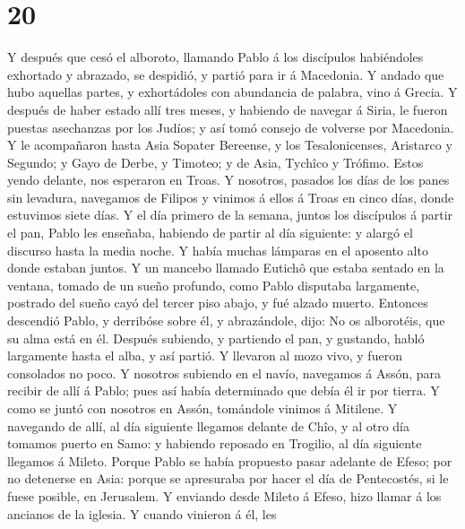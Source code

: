 \hypertarget{section-19}{%
\section{20}\label{section-19}}

 Y después que cesó el alboroto, llamando Pablo á los
discípulos habiéndoles exhortado y abrazado, se despidió, y partió para
ir á Macedonia.  Y andado que hubo aquellas partes, y
exhortádoles con abundancia de palabra, vino á Grecia.  Y
después de haber estado allí tres meses, y habiendo de navegar á Siria,
le fueron puestas asechanzas por los Judíos; y así tomó consejo de
volverse por Macedonia.  Y le acompañaron hasta Asia
Sopater Bereense, y los Tesalonicenses, Aristarco y Segundo; y Gayo de
Derbe, y Timoteo; y de Asia, Tychîco y Trófimo.  Estos
yendo delante, nos esperaron en Troas.  Y nosotros,
pasados los días de los panes sin levadura, navegamos de Filipos y
vinimos á ellos á Troas en cinco días, donde estuvimos siete días.
 Y el día primero de la semana, juntos los discípulos á
partir el pan, Pablo les enseñaba, habiendo de partir al día siguiente:
y alargó el discurso hasta la media noche.  Y había muchas
lámparas en el aposento alto donde estaban juntos.  Y un
mancebo llamado Eutichô que estaba sentado en la ventana, tomado de un
sueño profundo, como Pablo disputaba largamente, postrado del sueño cayó
del tercer piso abajo, y fué alzado muerto.  Entonces
descendió Pablo, y derribóse sobre él, y abrazándole, dijo: No os
alborotéis, que su alma está en él.  Después subiendo, y
partiendo el pan, y gustando, habló largamente hasta el alba, y así
partió.  Y llevaron al mozo vivo, y fueron consolados no
poco.  Y nosotros subiendo en el navío, navegamos á
Assón, para recibir de allí á Pablo; pues así había determinado que
debía él ir por tierra.  Y como se juntó con nosotros en
Assón, tomándole vinimos á Mitilene.  Y navegando de
allí, al día siguiente llegamos delante de Chîo, y al otro día tomamos
puerto en Samo: y habiendo reposado en Trogilio, al día siguiente
llegamos á Mileto.  Porque Pablo se había propuesto pasar
adelante de Efeso; por no detenerse en Asia: porque se apresuraba por
hacer el día de Pentecostés, si le fuese posible, en Jerusalem.
 Y enviando desde Mileto á Efeso, hizo llamar á los
ancianos de la iglesia.  Y cuando vinieron á él, les
